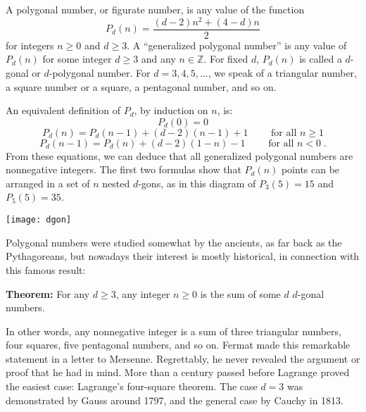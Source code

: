 \documentclass[12pt]{article}
\begin{document}
A polygonal number, or figurate number, is any value of the function
$$P_d(n)=\frac{(d-2)n^2+(4-d)n}{2}$$
for integers $n\ge 0$ and $d\ge 3$.
A ``generalized polygonal number''
is any value of $P_d(n)$ for some integer $d\ge 3$ and any $n\in\mathbb{Z}$.
For fixed $d$, $P_d(n)$ is called a $d$-gonal or $d$-polygonal number.
For $d=3,4,5,\ldots$, we speak of a triangular number, a square
number or a square, a pentagonal number, and so on.

An equivalent definition of $P_d$, by induction on $n$, is:
$$P_d(0)=0$$
$$P_d(n)=P_d(n-1)+(d-2)(n-1)+1\qquad\text{ for all }n\ge 1$$
$$P_d(n-1)=P_d(n)+(d-2)(1-n)-1\qquad\text{ for all }n<0\;.$$
From these equations, we can deduce that all generalized polygonal
numbers are nonnegative integers.
The first two formulas show that $P_d(n)$ points can be arranged in a
set of $n$ nested $d$-gons, as in this diagram of
$P_3(5)=15$ and $P_5(5)=35$.
\begin{center}\texttt{[image: dgon]}\end{center}

Polygonal numbers were studied somewhat by the ancients, as far
back as the Pythagoreans, but nowadays their interest
is mostly historical, in connection with this famous result:

\textbf{Theorem: }For any $d\ge 3$, any integer $n\ge 0$ is the
sum of some $d$ $d$-gonal numbers.

In other words, any nonnegative integer is a sum of three
triangular numbers, four squares, five pentagonal numbers,
and so on.
Fermat made this remarkable statement in a letter to Mersenne.
Regrettably, he never revealed the argument or proof that he
had in mind. More than a century passed before Lagrange proved
the easiest case: Lagrange's four-square theorem. The
case $d=3$ was demonstrated by Gauss around 1797, and the
general case by Cauchy in 1813.
\end{document}
